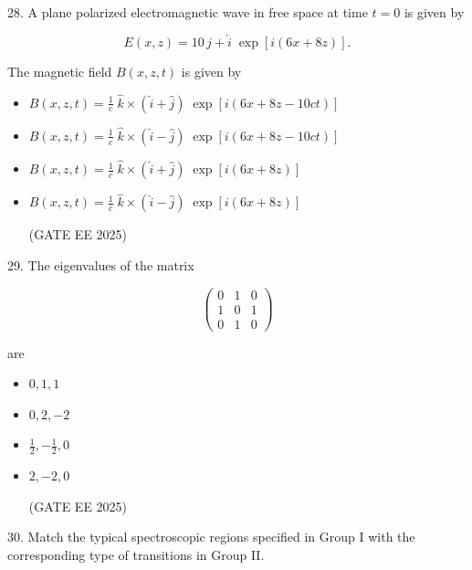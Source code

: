 \documentclass[twocolumn]{article}
\begin{document}
28. A plane polarized electromagnetic wave in free space at time $t = 0$ is given by


\[
E(x,z) = 10\, \hat{j} + \hat{i} \; \exp[ i(6x + 8z) ].
\]

The magnetic field $B(x,z,t)$ is given by

\begin{itemize}
\item[(A)] $\displaystyle B(x,z,t) = \frac{1}{c} \; \hat{k} \times (\hat{i} + \hat{j}) \; \exp[ i(6x + 8z - 10ct) ]$

\item[(B)] $\displaystyle B(x,z,t) = \frac{1}{c} \; \hat{k} \times (\hat{i} - \hat{j}) \; \exp[ i(6x + 8z - 10ct) ]$

\item[(C)] $\displaystyle B(x,z,t) = \frac{1}{c} \; \hat{k} \times (\hat{i} + \hat{j}) \; \exp[ i(6x + 8z) ]$

\item[(D)] $\displaystyle B(x,z,t) = \frac{1}{c} \; \hat{k} \times (\hat{i} - \hat{j}) \; \exp[ i(6x + 8z) ]$

(GATE EE 2025)
  \end{itemize}




29. The eigenvalues of the matrix


\[
\begin{pmatrix}
0 & 1 & 0 \\
1 & 0 & 1 \\
0 & 1 & 0
\end{pmatrix}
\]

are

\begin{itemize}
\item[(A)] $0, 1, 1$

\item[(B)] $0, 2, -2$

\item[(C)] $\frac{1}{2}, -\frac{1}{2}, 0$

\item[(D)] $2, -2, 0$

(GATE EE 2025)
  \end{itemize}




30. Match the typical spectroscopic regions specified in Group I with the corresponding type of transitions in Group II.
\end{document}
